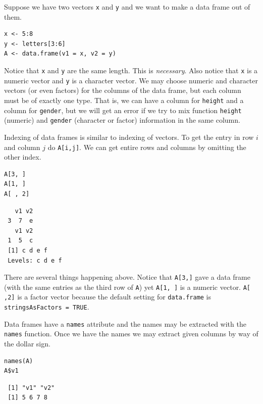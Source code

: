 \documentclass[captions=tableheading]{scrbook}
\begin{document}
\begin{example}
Suppose we have two vectors \texttt{x} and \texttt{y} and we want to make a data frame out of them.


\lstset{language=R}
\begin{lstlisting}
x <- 5:8
y <- letters[3:6]
A <- data.frame(v1 = x, v2 = y)
\end{lstlisting}

\end{example}

Notice that \texttt{x} and \texttt{y} are the same length. This is \emph{necessary}. Also notice that \texttt{x} is a numeric vector and \texttt{y} is a character vector. We may choose numeric and character vectors (or even factors) for the columns of the data frame, but each column must be of exactly one type. That is, we can have a column for \texttt{height} and a column for \texttt{gender}, but we will get an error if we try to mix function \texttt{height} (numeric) and \texttt{gender} (character or factor) information in the same column.

Indexing of data frames is similar to indexing of vectors. To get the entry in row \(i\) and column \(j\) do \texttt{A[i,j]}. We can get entire rows and columns by omitting the other index. 


\lstset{language=R}
\begin{lstlisting}
A[3, ]
A[1, ]
A[ , 2]
\end{lstlisting}

\begin{verbatim}
   v1 v2
 3  7  e
   v1 v2
 1  5  c
 [1] c d e f
 Levels: c d e f
\end{verbatim}

There are several things happening above. Notice that \texttt{A[3,]} gave a data frame (with the same entries as the third row of \texttt{A}) yet \texttt{A[1, ]} is a numeric vector. \texttt{A[ ,2]} is a factor vector because the default setting for \texttt{data.frame} is \texttt{stringsAsFactors = TRUE}.

Data frames have a \texttt{names} attribute and the names may be extracted with the \texttt{names} function. Once we have the names we may extract given columns by way of the dollar sign.


\lstset{language=R}
\begin{lstlisting}
names(A)
A$v1
\end{lstlisting}

\begin{verbatim}
 [1] "v1" "v2"
 [1] 5 6 7 8
\end{verbatim}
\end{document}
